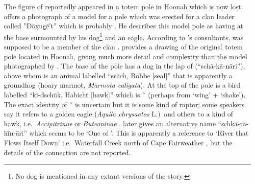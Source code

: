 The figure of  reportedly appeared in a totem pole in Hoonah which is now lost.
\citeauthor{swanton:1908} offers a photograph of a model for a pole which was erected for a  clan leader called ”Dāx̣ug̣ē′t” which is probably  \parencite[431 fig.\ 109]{swanton:1908}.
He describes this model pole as having  at the base surmounted by his dog\footnote{No dog is mentioned in any extant versions of the  story.} and an eagle.
According to \citeauthor{swanton:1908}’s consultants,  was supposed to be a member of the  clan \parencite[432]{swanton:1908}.
\citeauthor{krause:1885} provides a drawing of the original totem pole located in Hoonah, giving much more detail and complexity than the model photographed by \citeauthor{swanton:1909} \parencites[132]{krause:1885}[94]{krause:1956}.
The base of the pole has a dog in the lap of  (“schā-kā-nāri”), above whom is an animal labelled “ssāch, Robbe [seal]” that is apparently a groundhog  (hoary marmot, \textit{Marmota caligata}).
At the top of the pole is a bird labelled “kī-dschūk, Habicht [hawk]” which is  \~\  (perhaps from  ‘wing’ +  ‘shake’).
The exact identity of  \~\  is uncertain but it is some kind of raptor; some speakers say it refers to a golden eagle (\textit{Aquila chrysaetos} L.)\ and others to a kind of hawk, i.e.\ \textit{Accipitrinae} or \textit{Buteoninae} \parencites[127]{boas:1917}[257]{krause:1956}[44]{olson:1967}[47]{de-laguna:1972}[28]{naish-story:1976}[33, 255, 441–442, 458]{emmons:1991}[\textsc{m}·137]{leer:2001}.
\citeauthor{krause:1885} later gives  an alternative name “schkā-tā-hīn-āri” \parencites[380]{krause:1885}[251]{krause:1956} which seems to be  ‘One of ’.
This is apparently a reference to  ‘River that Flows Itself Down’ i.e.\ Waterfall Creek north of Cape Fairweather \parencite[25 \#289, 40 \#31]{thornton:2012}, but the details of the connection are not reported.

